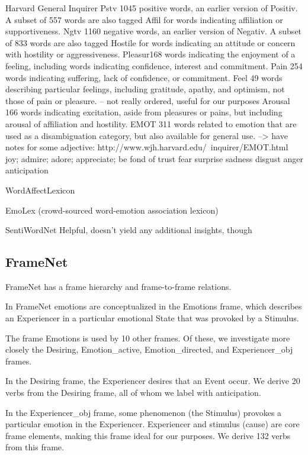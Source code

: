 Harvard General Inquirer
Pstv 1045 positive words, an earlier version of Positiv.
A subset of 557 words are also tagged Affil for words indicating affiliation or supportiveness.
Ngtv 1160 negative words, an earlier version of Negativ.
A subset of 833 words are also tagged Hostile for words indicating an attitude or concern with hostility or aggressiveness.
Pleasur168 words indicating the enjoyment of a feeling, including words indicating confidence, interest and commitment.
Pain 254 words indicating suffering, lack of confidence, or commitment.
Feel 49 words describing particular feelings, including gratitude, apathy, and optimism, not those of pain or pleasure.
-- not really ordered, useful for our purposes
Arousal 166 words indicating excitation, aside from pleasures or pains, but including arousal of affiliation and hostility.
EMOT 311 words related to emotion that are used as a disambiguation category, but also available for general use.
--> have notes for some adjective: http://www.wjh.harvard.edu/~inquirer/EMOT.html
joy; admire; adore; appreciate; be fond of
trust
fear
surprise
sadness
disgust
anger
anticipation

WordAffectLexicon



EmoLex (crowd-sourced word-emotion association lexicon)


SentiWordNet
Helpful, doesn't yield any additional insights, though


\subsection{FrameNet}

FrameNet has a frame hierarchy and frame-to-frame relations.

In FrameNet emotions are conceptualized in the Emotions frame, which describes an Experiencer in a particular emotional State that was provoked by a Stimulus.

The frame Emotions is used by 10 other frames. Of these, we investigate more closely the Desiring, Emotion\_active, Emotion\_directed, and Experiencer\_obj frames.

In the Desiring frame, the Experiencer desires that an Event occur. We derive 20 verbs from the Desiring frame, all of whom we label with anticipation.

In the Experiencer\_obj frame, some phenomenon (the Stimulus) provokes a particular emotion in the Experiencer. Experiencer and stimulus (cause) are core frame elements, making this frame ideal for our purposes. We derive 132 verbs from this frame.

